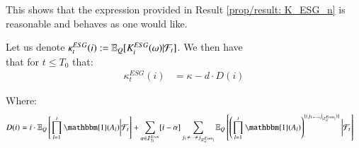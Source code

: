 This shows that the expression provided in Result \ref{prop/result: K_ESG_n} is reasonable and behaves as one would like.  

\newpage 

\begin{proposition}
\label{prop: cond_expectation_ESG_sequence}
Let us denote $\kappa_{t}^{ESG}(i) := \mathbb{E}_{Q}[K_{i}^{ESG}(\omega)|\mathcal{F}_{t}]$. 
We then have\\ 
that for $t\leq T_{0}$ that: 
\begin{align*}
\kappa_{t}^{ESG}(i)
&= 
\kappa -d\cdot D(i)
\end{align*}

Where: 
\begin{align*}
 D(i) &= 
i\cdot \E_{Q}\left[
\prod_{l=1}^{i}\mathbbm{1}(A_{l})\bigg{|}\F_{t}
\right]
+ 
\sum_{\alpha \in \mathcal{I}_{2i}^{Even}}[i-\alpha]
\sum_{
j_{1}\neq \dots \neq j_{|\mathcal{I}_{\alpha}^{Even}|}
}
\E_{Q}\left[
\left(
\prod_{l=1}^{i}\mathbbm{1}(A_{l})
\right)^{
\{
(j_{1}, \dots , j_{|\mathcal{I}_{\alpha}^{Even}|})
\}
}
\bigg{|}\F_{t}
\right]   
\end{align*}
\end{proposition}


